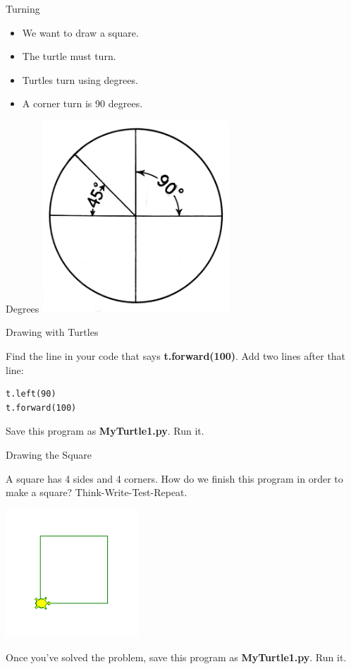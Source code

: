 \documentclass{beamer}
\begin{document}
\begin{frame}{Turning}
\begin{itemize}
\item We want to draw a square.
\item The turtle must turn.
\item Turtles turn using degrees.
\item A corner turn is 90 degrees.
\end{itemize}

\end{frame}

\begin{frame}{Degrees}
\includegraphics[width=70mm]{images/circle.png}
\end{frame}

\begin{frame}[fragile]{Drawing with Turtles}

Find the line in your code that says \textbf{t.forward(100)}. Add two lines after that line:

\begin{verbatim}
t.left(90)
t.forward(100)
\end{verbatim}

Save this program as \textbf{MyTurtle1.py}. Run it.
\end{frame}

\begin{frame}{Drawing the Square}

A square has 4 sides and 4 corners. How do we finish this program in order to make a square? Think-Write-Test-Repeat.

\includegraphics[width=50mm]{images/turtleSquare.png}

Once you've solved the problem, save this program as \textbf{MyTurtle1.py}. Run it.
\end{frame}
\end{document}
